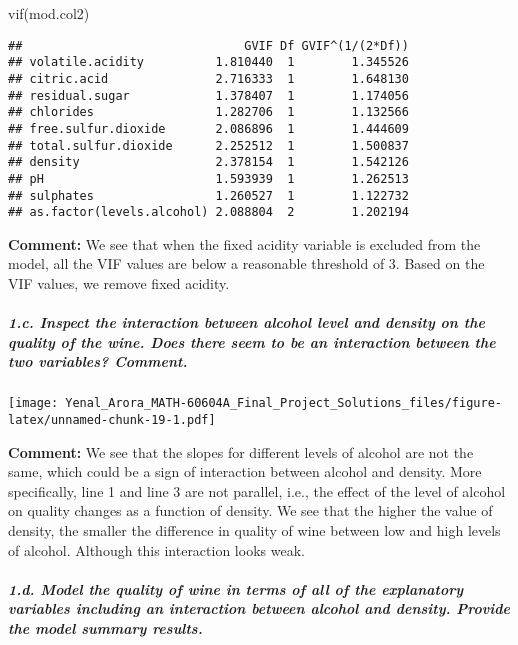 \documentclass[
]{article}
\newenvironment{Shaded}{\begin{snugshade}}{\end{snugshade}}
\newcommand{\FunctionTok}[1]{\textcolor[rgb]{0.00,0.00,0.00}{#1}}
\newcommand{\NormalTok}[1]{#1}
\begin{document}
\begin{Shaded}
\begin{Highlighting}[]
\FunctionTok{vif}\NormalTok{(mod.col2)}
\end{Highlighting}
\end{Shaded}

\begin{verbatim}
##                               GVIF Df GVIF^(1/(2*Df))
## volatile.acidity          1.810440  1        1.345526
## citric.acid               2.716333  1        1.648130
## residual.sugar            1.378407  1        1.174056
## chlorides                 1.282706  1        1.132566
## free.sulfur.dioxide       2.086896  1        1.444609
## total.sulfur.dioxide      2.252512  1        1.500837
## density                   2.378154  1        1.542126
## pH                        1.593939  1        1.262513
## sulphates                 1.260527  1        1.122732
## as.factor(levels.alcohol) 2.088804  2        1.202194
\end{verbatim}

\textbf{Comment:} We see that when the fixed acidity variable is
excluded from the model, all the VIF values are below a reasonable
threshold of 3. Based on the VIF values, we remove fixed acidity.

\hypertarget{c.-inspect-the-interaction-between-alcohol-level-and-density-on-the-quality-of-the-wine.-does-there-seem-to-be-an-interaction-between-the-two-variables-comment.}{%
\subparagraph{1.c. Inspect the interaction between alcohol level and
density on the quality of the wine. Does there seem to be an interaction
between the two variables?
Comment.}\label{c.-inspect-the-interaction-between-alcohol-level-and-density-on-the-quality-of-the-wine.-does-there-seem-to-be-an-interaction-between-the-two-variables-comment.}}

\texttt{[image: Yenal\_Arora\_MATH-60604A\_Final\_Project\_Solutions\_files/figure-latex/unnamed-chunk-19-1.pdf]}

\textbf{Comment:} We see that the slopes for different levels of alcohol
are not the same, which could be a sign of interaction between alcohol
and density. More specifically, line 1 and line 3 are not parallel,
i.e., the effect of the level of alcohol on quality changes as a
function of density. We see that the higher the value of density, the
smaller the difference in quality of wine between low and high levels of
alcohol. Although this interaction looks weak.

\hypertarget{d.-model-the-quality-of-wine-in-terms-of-all-of-the-explanatory-variables-including-an-interaction-between-alcohol-and-density.-provide-the-model-summary-results.}{%
\subparagraph{1.d. Model the quality of wine in terms of all of the
explanatory variables including an interaction between alcohol and
density. Provide the model summary
results.}\label{d.-model-the-quality-of-wine-in-terms-of-all-of-the-explanatory-variables-including-an-interaction-between-alcohol-and-density.-provide-the-model-summary-results.}}
\end{document}
